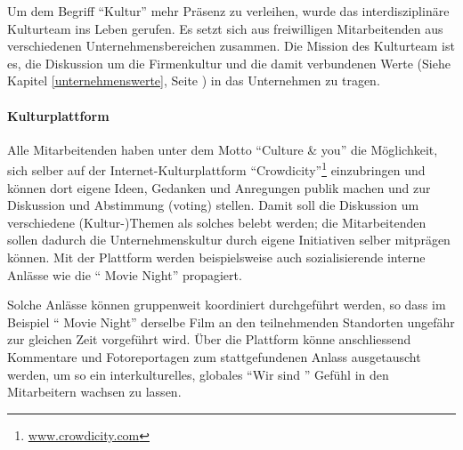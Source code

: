 \begin{sloppypar}
Um dem Begriff "`Kultur"' mehr Präsenz zu verleihen, wurde das interdisziplinäre Kulturteam ins Leben gerufen. Es setzt sich aus freiwilligen Mitarbeitenden aus verschiedenen Unternehmensbereichen zusammen. Die Mission des Kulturteam ist es, die Diskussion um die Firmenkultur und die damit verbundenen Werte (Siehe Kapitel \ref{unternehmenswerte}, Seite \pageref{unternehmenswerte}) in das Unternehmen zu tragen.
\end{sloppypar}

\paragraph*{Kulturplattform}\mbox{}

\begin{sloppypar}
Alle Mitarbeitenden haben unter dem Motto "`Culture \& you"' die Möglichkeit, sich selber auf der Internet-Kulturplattform "`Crowdicity"'\footnote{\url{www.crowdicity.com}} einzubringen und können dort eigene Ideen, Gedanken und Anregungen publik machen und zur Diskussion und Abstimmung (voting) stellen. Damit soll die Diskussion um verschiedene (Kultur-)Themen als solches belebt werden; die Mitarbeitenden sollen dadurch die Unternehmenskultur durch eigene Initiativen selber mitprägen können. Mit der Plattform werden beispielsweise auch sozialisierende interne Anlässe wie die "`\companyshort{} Movie Night"' propagiert.

Solche Anlässe können gruppenweit koordiniert durchgeführt werden, so dass im Beispiel "`\companyshort{} Movie Night"' derselbe Film an den teilnehmenden Standorten ungefähr zur gleichen Zeit vorgeführt wird. Über die Plattform könne anschliessend Kommentare und Fotoreportagen zum stattgefundenen Anlass ausgetauscht werden, um so ein interkulturelles, globales "`Wir sind \companyshort"' Gefühl in den Mitarbeitern wachsen zu lassen.
\end{sloppypar}